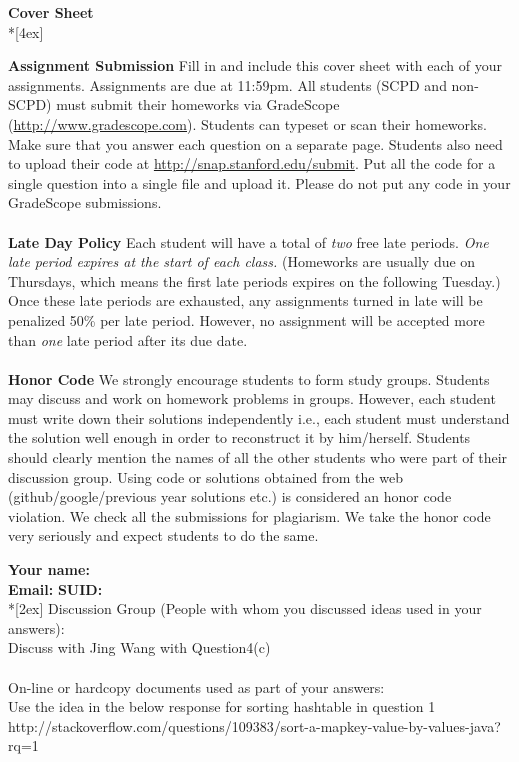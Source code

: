\documentclass[11pt]{article}
\begin{document}
\thispagestyle{empty}
\parindent 0pt
\vfill
\large

\pagebreak[4]
\begin{center}
\LARGE{\bf \textsf{Cover Sheet}} \\*[4ex]
\end{center}

\textbf{Assignment Submission } Fill in and include this cover sheet with each of your assignments. Assignments are due at 11:59pm. All students (SCPD and non-SCPD) must submit their homeworks via GradeScope (\url{http://www.gradescope.com}). Students can typeset or scan their homeworks. Make sure that you answer each question on a separate page. Students also need to upload their code at \url{http://snap.stanford.edu/submit}. Put all the code for a single question into a single file and upload it. Please do not put any code in your GradeScope submissions.
\\
\\
\textbf{Late Day Policy } Each student will have a total of {\em two} free late periods. {\em One late period expires at the start of each class.} (Homeworks are usually due on Thursdays, which means the first late periods expires on the following Tuesday.) Once these late periods are exhausted, any assignments turned in late will be penalized 50\% per late period. However, no assignment will be accepted more than {\em one} late period after its due date.
\\
\\
\textbf{Honor Code } We strongly encourage students to form study groups. Students may discuss and work on homework problems in groups. However, each student must write down their solutions independently i.e., each student must understand the solution well enough in order to reconstruct it by him/herself.  Students should clearly mention the names of all the other students who were part of their discussion group. Using code or solutions obtained from the web (github/google/previous year solutions etc.) is considered an honor code violation. We check all the submissions for plagiarism. We take the honor code very seriously and expect students to do the same.

\vfill
\vfill

{\Large
\textbf{Your name:} \hrulefill \\
\textbf{Email:} \underline{\hspace*{7cm}} \textbf{SUID:} \hrulefill\\*[2ex] }
Discussion Group (People with whom you discussed ideas used in your answers): \\
Discuss with Jing Wang with Question4(c)
\\\\
On-line or hardcopy documents used as part of your answers: \\
Use the idea in the below response for sorting hashtable in question 1\\
http://stackoverflow.com/questions/109383/sort-a-mapkey-value-by-values-java?rq=1\\
\\
\vfill
\end{document}
